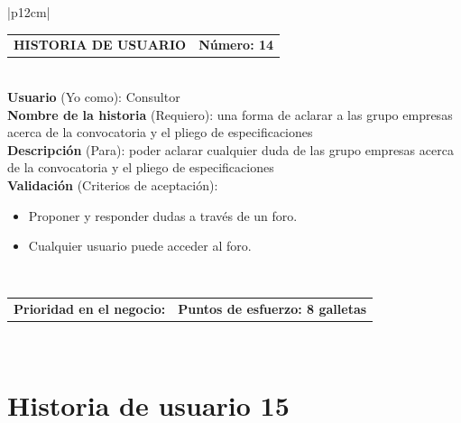 \documentclass[11pt,letterpaper]{report}
\begin{document}
	\begin{center}	
		\begin{tabular}{|p{12cm}|}
			\hline
			\begin{tabular}{c|c}
				\textbf{HISTORIA DE USUARIO} & \textbf{Número: 14} \\
			\end{tabular} \\ \hline
			\textbf{Usuario} (Yo como): Consultor \\ \hline
			\textbf{Nombre de la historia} (Requiero): una forma de aclarar a las grupo empresas acerca de la convocatoria y el pliego de especificaciones \\ \hline
			\textbf{Descripción} (Para): poder aclarar cualquier duda de las grupo empresas acerca de la convocatoria y el pliego de especificaciones \\ \hline
			\textbf{Validación} (Criterios de aceptación): \\
			\begin{minipage}{12cm}
				\begin{itemize}
					\item Proponer y responder dudas a través de un foro.
					\item Cualquier usuario puede acceder al foro.
				\end{itemize}
			\end{minipage} \\ \hline
			\begin{tabular}{p{6cm}|c}
				\textbf{Prioridad en el negocio: } & \textbf{Puntos de esfuerzo: 8 galletas} \\
			\end{tabular} \\ \hline
		\end{tabular}
	\end{center}
	
	\section{Historia de usuario 15}
	
\end{document}
